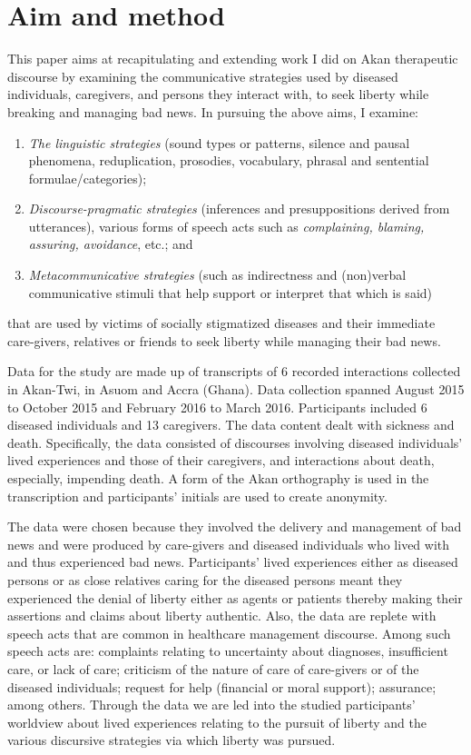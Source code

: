 \documentclass[output=paper,colorlinks,citecolor=brown]{langscibook}
\begin{document}
\section{Aim and method}\label{sec:obeng:3}

This paper aims at recapitulating and extending work I did on Akan therapeutic discourse \citep{Obeng2008} by examining the communicative strategies used by diseased individuals, caregivers, and persons they interact with, to seek liberty while breaking and managing bad news. In pursuing the above aims, I examine:

\begin{enumerate}\sloppy
     \item \textit{The linguistic strategies} (sound types or patterns, silence and pausal phenomena, reduplication, prosodies, vocabulary, phrasal and sentential formulae/categories);
     \item \textit{Discourse-pragmatic strategies} (inferences and presuppositions derived from utterances), various forms of speech acts such as \textit{complaining, blaming, assuring, avoidance}, etc.; and
     \item \textit{Metacommunicative strategies} (such as indirectness and (non)verbal communicative stimuli that help support or interpret that which is said)
\end{enumerate}

that are used by victims of socially stigmatized diseases and their immediate care-givers, relatives or friends to seek liberty while managing their bad news. 

Data for the study are made up of transcripts of 6 recorded interactions collected in Akan-Twi, in Asuom and Accra (Ghana). Data collection spanned August 2015 to October 2015 and February 2016 to March 2016. Participants included 6 diseased individuals and 13 caregivers. The data content dealt with sickness and death. Specifically, the data consisted of discourses involving diseased individuals’ lived experiences and those of their caregivers, and interactions about death, especially, impending death. A form of the Akan orthography is used in the transcription and participants’ initials are used to create anonymity. 

The data were chosen because they involved the delivery and management of bad news and were produced by care-givers and diseased individuals who lived with and thus experienced bad news. Participants’ lived experiences either as diseased persons or as close relatives caring for the diseased persons meant they experienced the denial of liberty either as agents or patients thereby making their assertions and claims about liberty authentic. Also, the data are replete with speech acts that are common in healthcare management discourse. Among such speech acts are: complaints relating to uncertainty about diagnoses, insufficient care, or lack of care; criticism of the nature of care of care-givers or of the diseased individuals; request for help (financial or moral support); assurance; among others. Through the data we are led into the studied participants’ worldview about lived experiences relating to the pursuit of liberty and the various discursive strategies via which liberty was pursued.
\end{document}
